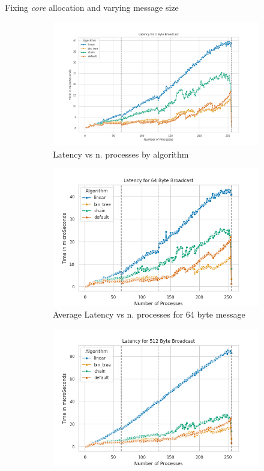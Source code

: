 \documentclass[11pt]{beamer}
\begin{document}
\begin{frame}{Fixing \textit{core} allocation and varying message size}
	\begin{figure}[h]
		\centering
		\begin{subfigure}{0.45\textwidth}
			\centering
			\includegraphics[width=0.7\linewidth]{../exercise1/plots/bcast_all_1byte}
			\caption{Latency vs n. processes by algorithm}
			\label{fig:bcastall1byte}
		\end{subfigure}
		\begin{subfigure}{0.45\textwidth}
			\centering
			\includegraphics[width=0.7\linewidth]{../exercise1/plots/bcast_all_64byte}
			\caption{Average Latency vs n. processes for 64 byte message}
			\label{fig:bcastall64byte}
		\end{subfigure}
		\begin{subfigure}{0.45\textwidth}
			\centering
			\includegraphics[width=0.7\linewidth]{../exercise1/plots/bcast_all_512byte}

\end{subfigure}
\end{figure}
\end{frame}
\end{document}
